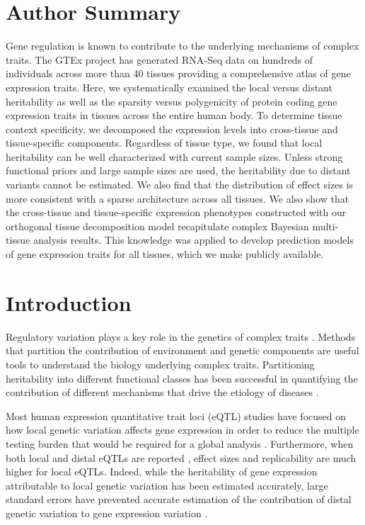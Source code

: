 \documentclass[10pt,letterpaper]{article}
\begin{document}
\section*{Author Summary}
Gene regulation is known to contribute to the underlying mechanisms of complex traits. The GTEx project has generated RNA-Seq data on hundreds of individuals across more than 40 tissues providing a comprehensive atlas of gene expression traits. Here, we systematically examined the local versus distant heritability as well as the sparsity versus polygenicity of protein coding gene expression traits in tissues across the entire human body. To determine tissue context specificity, we decomposed the expression levels into cross-tissue and tissue-specific components. Regardless of tissue type, we found that local heritability can be well characterized with current sample sizes. Unless strong functional priors and large sample sizes are used, the heritability due to distant variants cannot be estimated. We also find that the distribution of effect sizes is more consistent with a sparse architecture across all tissues. We also show that the cross-tissue and tissue-specific expression phenotypes constructed with our orthogonal tissue decomposition model recapitulate complex Bayesian multi-tissue analysis results. This knowledge was applied to develop prediction models of gene expression traits for all tissues, which we make publicly available.

\linenumbers

\section*{Introduction}
Regulatory variation plays a key role in the genetics of complex traits \cite{Nicolae_2010, Nica_2010, Gusev_2014}. Methods that partition the contribution of environment and genetic components are useful tools to understand the biology underlying complex traits. Partitioning heritability into different functional classes has been successful in quantifying the contribution of different mechanisms that drive the etiology of diseases \cite{Gusev_2014,torres2014cross,davis2013partitioning}.

Most human expression quantitative trait loci (eQTL) studies have focused on how local genetic variation affects gene expression in order to reduce the multiple testing burden that would be required for a global analysis \cite{Albert_2015, Stranger_2012}. Furthermore, when both local and distal eQTLs are reported \cite{Stranger_2007,Innocenti_2011,Wright_2014}, effect sizes and replicability are much higher for local eQTLs. Indeed, while the heritability of gene expression attributable to local genetic variation has been estimated accurately, large standard errors have prevented accurate estimation of the contribution of distal genetic variation to gene expression variation \cite{Wright_2014,Price_2011}. 
\end{document}
